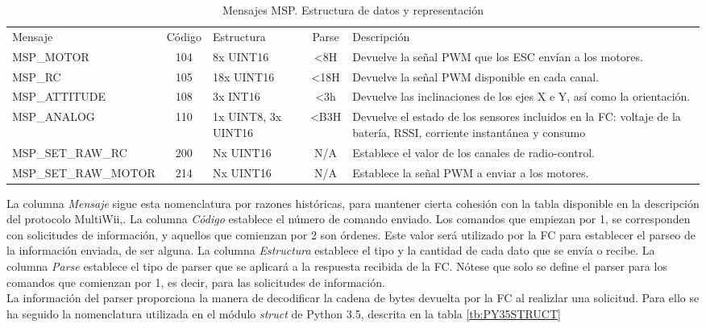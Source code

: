 \begin{table}
	\begin{center}	
		\begin{tabular}{m{5cm} | c | m{2cm} | c | m{5cm}}\hline
			\toprule
			Mensaje & Código & Estructura & Parse & Descripción\\
			\otoprule
			MSP\_MOTOR & 104 & 8x UINT16 & <8H & Devuelve la señal PWM que los ESC envían a los motores.\\
			MSP\_RC & 105 & 18x UINT16 & <18H & Devuelve la señal PWM disponible en cada canal.\\
			MSP\_ATTITUDE & 108  & 3x INT16 & <3h & Devuelve las inclinaciones de los ejes X e Y, así como la orientación.\\
			MSP\_ANALOG & 110 & 1x UINT8, 3x UINT16 & <B3H & Devuelve el estado de los sensores incluidos en la FC: voltaje de la batería, RSSI, corriente instantánea y consumo\\
			MSP\_SET\_RAW\_RC & 200 & Nx UINT16 & N/A & Establece el valor de los canales de radio-control.\\
			MSP\_SET\_RAW\_MOTOR & 214 & Nx UINT16 & N/A & Establece la señal PWM a enviar a los motores.\\
			\bottomrule
		\end{tabular}
		\caption{Mensajes MSP. Estructura de datos y representación}
		\label{tb:MSP_MESSAGES}
	\end{center}
\end{table} 

La columna \textit{Mensaje} sigue esta nomenclatura por razones históricas, para mantener cierta cohesión con la tabla disponible en la descripción del protocolo MultiWii,\cite{MSP Definition}. La columna \textit{Código} establece el número de comando enviado. Los comandos que empiezan por 1, se corresponden con solicitudes de información, y aquellos que comienzan por 2 son órdenes. Este valor será utilizado por la FC para establecer el parseo de la información enviada, de ser alguna. La columna \textit{Estructura} establece el tipo y la cantidad de cada dato que se envía o recibe. La columna \textit{Parse} establece el tipo de parser que se aplicará a la respuesta recibida de la FC. Nótese que solo se define el parser para los comandos que comienzan por 1, es decir, para las solicitudes de información.
\\La información del parser proporciona la manera de decodificar la cadena de bytes devuelta por la FC al realizlar una solicitud. Para ello se ha seguido la nomenclatura utilizada en el módulo \textit{struct} de Python 3.5, descrita en la tabla \ref{tb:PY35STRUCT}

